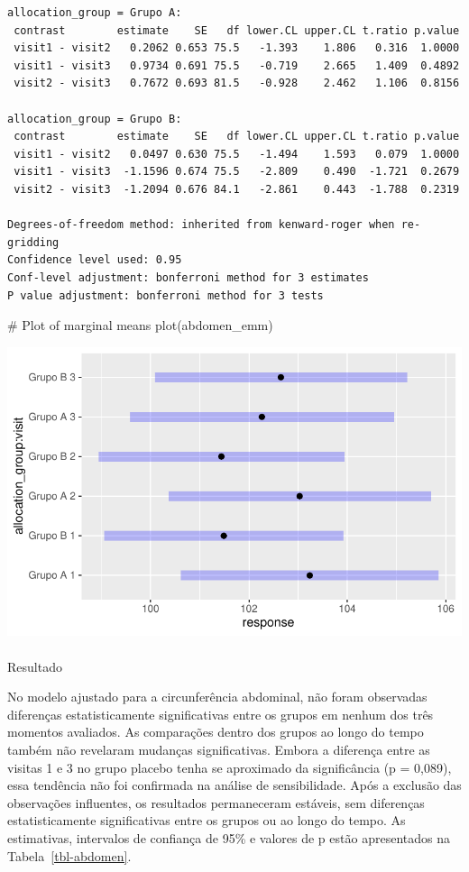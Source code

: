 \documentclass[
  12pt,
]{article}
\makeatletter
\let\oldparagraph\paragraph
\renewcommand{\paragraph}{
    \@ifstar
      \xxxParagraphStar
      \xxxParagraphNoStar
  }
\newcommand{\xxxParagraphStar}[1]{\oldparagraph*{#1}\mbox{}}
\newcommand{\xxxParagraphNoStar}[1]{\oldparagraph{#1}\mbox{}}
\newenvironment{Shaded}{\begin{snugshade}}{\end{snugshade}}
\newcommand{\CommentTok}[1]{\textcolor[rgb]{0.37,0.37,0.37}{#1}}
\newcommand{\FunctionTok}[1]{\textcolor[rgb]{0.28,0.35,0.67}{#1}}
\newcommand{\NormalTok}[1]{\textcolor[rgb]{0.00,0.23,0.31}{#1}}
\makeatother
\begin{document}
\begin{verbatim}
allocation_group = Grupo A:
 contrast        estimate    SE   df lower.CL upper.CL t.ratio p.value
 visit1 - visit2   0.2062 0.653 75.5   -1.393    1.806   0.316  1.0000
 visit1 - visit3   0.9734 0.691 75.5   -0.719    2.665   1.409  0.4892
 visit2 - visit3   0.7672 0.693 81.5   -0.928    2.462   1.106  0.8156

allocation_group = Grupo B:
 contrast        estimate    SE   df lower.CL upper.CL t.ratio p.value
 visit1 - visit2   0.0497 0.630 75.5   -1.494    1.593   0.079  1.0000
 visit1 - visit3  -1.1596 0.674 75.5   -2.809    0.490  -1.721  0.2679
 visit2 - visit3  -1.2094 0.676 84.1   -2.861    0.443  -1.788  0.2319

Degrees-of-freedom method: inherited from kenward-roger when re-gridding 
Confidence level used: 0.95 
Conf-level adjustment: bonferroni method for 3 estimates 
P value adjustment: bonferroni method for 3 tests 
\end{verbatim}

\begin{Shaded}
\begin{Highlighting}[]
\CommentTok{\# Plot of marginal means}
\FunctionTok{plot}\NormalTok{(abdomen\_emm)}
\end{Highlighting}
\end{Shaded}

\includegraphics{Outcomes_files/figure-pdf/abdomen_sens_emm-1.pdf}

\paragraph{Resultado}\label{resultado-13}

No modelo ajustado para a circunferência abdominal, não foram observadas
diferenças estatisticamente significativas entre os grupos em nenhum dos
três momentos avaliados. As comparações dentro dos grupos ao longo do
tempo também não revelaram mudanças significativas. Embora a diferença
entre as visitas 1 e 3 no grupo placebo tenha se aproximado da
significância (p = 0,089), essa tendência não foi confirmada na análise
de sensibilidade. Após a exclusão das observações influentes, os
resultados permaneceram estáveis, sem diferenças estatisticamente
significativas entre os grupos ou ao longo do tempo. As estimativas,
intervalos de confiança de 95\% e valores de p estão apresentados na
Tabela~\ref{tbl-abdomen}.
\end{document}
